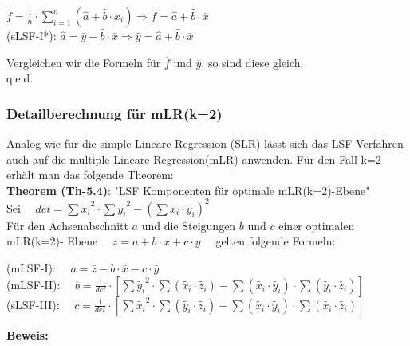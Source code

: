\documentclass[12pt]{article}
\begin{document}
\begin{large}
\begin{center}
$ \overline{f} = \frac{1}{n} \cdot \sum_{i=1}^{n} (\hat{a}+ \hat{b} \cdot x_i) \Longrightarrow \overline{f} = \hat{a} + \hat{b} \cdot  \overline{x} $ \\[0.2cm]
(sLSF-I*): $ \hat{a}  = \bar{y} - \hat{b} \cdot \bar{x} \Longrightarrow \bar{y}  = \hat{a} + \hat{b} \cdot \bar{x} $
\end{center} 
\end{large}
Vergleichen wir die Formeln für  $\overline{f}$ und $\overline{y}$, so sind diese gleich. \\
q.e.d.

\subsubsection{Detailberechnung für mLR(k=2)}
%
Analog wie für die simple Lineare Regression (SLR) lässt sich das LSF-Verfahren auch auf die multiple Lineare Regression(mLR) anwenden. Für den Fall k=2 erhält man das folgende Theorem:\\[0.4cm]
%
\textbf{Theorem (Th-5.4)}: "LSF Komponenten für optimale mLR(k=2)-Ebene" \\[0.2cm]
Sei $ \quad det = \sum{\widetilde{x_i}^2} \cdot \sum{\widetilde{y_i}^2}  -  (\sum{\widetilde{x_i} \cdot \widetilde{y_i}})^2 \quad $ \\
Für den Achsenabschnitt $a$ und die Steigungen $b$ und $c$ einer optimalen mLR(k=2)- Ebene $\quad  z = a +  b \cdot x + c \cdot y \quad $  
gelten folgende Formeln:\\[0.5cm]
\begin{large}
(mLSF-I): $ \quad a = \bar{z} - b \cdot \bar{x} - c \cdot \bar{y} \ \qquad \qquad \qquad\qquad $ \\[0.3cm]
(mLSF-II): $ \quad b = \frac{1}{det} \cdot \left[  \sum{\widetilde{y_i}^2} \cdot  \sum{(\widetilde{x_i} \cdot \widetilde{z_i})} - \sum{(\widetilde{x_i} \cdot \widetilde{y_i})} \cdot  \sum{(\widetilde{y_i} \cdot \widetilde{z_i})}          \right] $    \\[0.3cm]                                
(sLSF-III): $ \quad c = \frac{1}{det} \cdot \left[ \sum{\widetilde{x_i}^2} \cdot  \sum{(\widetilde{y_i} \cdot \widetilde{z_i})} - \sum{(\widetilde{x_i} \cdot \widetilde{y_i})} \cdot  \sum{( \widetilde{x_i} \cdot \widetilde{z_i})}          \right] $  \\[0.7cm]
\end{large}
\textbf{Beweis:}\\[0.2cm]
\end{document}
